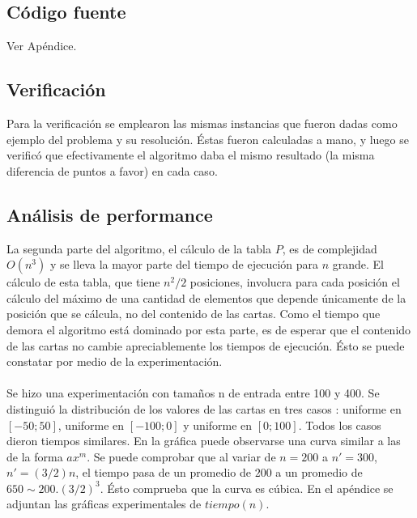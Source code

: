 \subsection{C\'odigo fuente}
Ver Ap\'endice.

\subsection{Verificaci\'on}
Para la verificaci\'on se emplearon las mismas instancias que fueron dadas como ejemplo del problema y su resoluci\'on. \'Estas fueron calculadas a mano, y luego se verific\'o que efectivamente el algoritmo daba el mismo resultado (la misma diferencia de puntos a favor) en cada caso.

\subsection{An\'alisis de performance}
La segunda parte del algoritmo, el c\'alculo de la tabla $P$, es de complejidad $O(n^3)$ y se lleva la mayor parte del tiempo de ejecuci\'on para $n$ grande.
El c\'alculo de esta tabla, que tiene $n^2/2$ posiciones, involucra para cada posici\'on el c\'alculo del m\'aximo de una cantidad de elementos que depende \'unicamente de la posici\'on que se c\'alcula, no del contenido de las cartas. Como el tiempo que demora el algoritmo est\'a dominado por esta parte, es de esperar que el contenido de las cartas no cambie apreciablemente los tiempos de ejecuci\'on. \'Esto se puede constatar por medio de la experimentaci\'on.\\
\\
Se hizo una experimentaci\'on con tama\~nos n de entrada entre 100 y 400. Se distingui\'o la distribuci\'on de los valores de las cartas en tres casos : uniforme en $[-50;50]$, uniforme en $[-100;0]$ y uniforme en $[0;100]$. Todos los casos dieron tiempos similares. En la gr\'afica puede observarse una curva similar a las de la forma $ax^{m}$. Se puede comprobar que al variar de $n=200$ a $n'=300$, $n'=(3/2)n$, el tiempo pasa de un promedio de $200$ a un promedio de $650 \sim 200.(3/2)^3$. \'Esto comprueba que la curva es c\'ubica.
En el ap\'endice se adjuntan las gr\'aficas experimentales de $tiempo(n)$.

%
